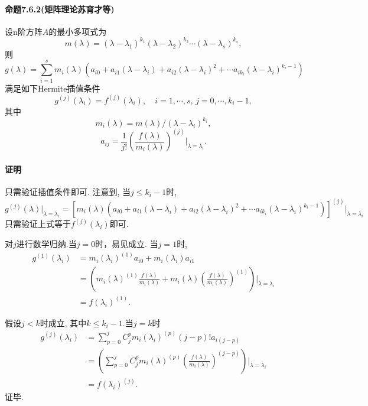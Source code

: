 \paragraph{命题7.6.2(矩阵理论苏育才等)} 设n阶方阵$A$的最小多项式为
$$m(\lambda) = (\lambda-\lambda_1)^{k_1}(\lambda-\lambda_2)^{k_2}\cdots(\lambda-\lambda_s)^{k_s},$$
则
$$g(\lambda)=\sum_{i=1}^s m_i(\lambda)
\left(a_{i0} + a_{i1}(\lambda-\lambda_i) 
+a_{i2}(\lambda-\lambda_i)^2 +\cdots a_{ik_i}(\lambda-\lambda_i)^{k_i-1}\right)$$
满足如下Hermite插值条件
$$g^{(j)}(\lambda_i) = f^{(j)}(\lambda_i),\quad i=1,\cdots,s,\,j=0,\cdots,k_i-1,$$
其中
$$m_i(\lambda) = m(\lambda)/(\lambda-\lambda_i)^{k_i},$$
$$a_{ij} = \frac{1}{j!}\left(\frac{f(\lambda)}{m_i(\lambda)} \right)^{(j)}
\bigg|_{\lambda=\lambda_i}.$$

\paragraph{证明}
只需验证插值条件即可. 注意到, 当$j \le k_i-1$时,
$$g^{(j)}(\lambda)\bigg|_{\lambda=\lambda_i} = 
\left[
m_i(\lambda)
\left(a_{i0} + a_{i1}(\lambda-\lambda_i) 
+a_{i2}(\lambda-\lambda_i)^2 +\cdots a_{ik_i}(\lambda-\lambda_i)^{k_i-1}\right)
\right]^{(j)}\bigg|_{\lambda=\lambda_i}
$$
只需验证上式等于$f^{(j)}(\lambda_i)$即可.

对$j$进行数学归纳.当$j=0$时，易见成立.
当$j=1$时,
\begin{equation}
\nonumber
\begin{aligned}
g^{(1)}(\lambda_i) &=
m_i(\lambda_i)^{(1)}a_{i0}+
m_i(\lambda_i)a_{i1}\\
&=
\left(m_i(\lambda)^{(1)}\frac{f(\lambda)}{m_i(\lambda)}+
m_i(\lambda)
\left(
	\frac{f(\lambda)}{m_i(\lambda)}\right)^{(1)}
\right) \Bigg|_{\lambda = \lambda_i}\\
&=f(\lambda_i)^{(1)}.
\end{aligned}
\end{equation}

假设$j<k$时成立, 其中$k\le k_i-1$.当$j=k$时
\begin{equation}
\nonumber
\begin{aligned}
g^{(j)}(\lambda_i) &=
\sum_{p=0}^{j}C_{j}^p
m_i(\lambda_i)^{(p)}(j-p)!a_{i(j-p)}\\
&=
\left(
\sum_{p=0}^{j}C_{j}^p
m_i(\lambda)^{(p)}
\left(\frac{f(\lambda)}{m_i(\lambda)} \right)^{(j-p)}
\right) \Bigg|_{\lambda = \lambda_i}\\
&=f(\lambda_i)^{(j)}.
\end{aligned}
\end{equation}
证毕.


